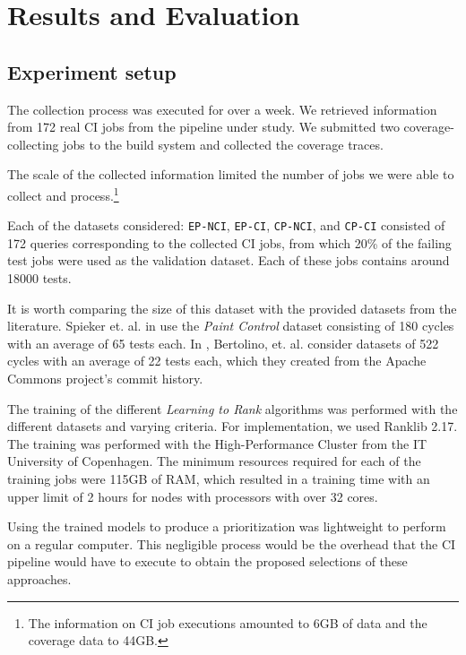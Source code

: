 \chapter{Results and Evaluation}\label{s:results}

\section{Experiment setup}\label{s:results-experimentsetup}

The collection process was executed for over a week. We retrieved information from
172 real CI jobs from the pipeline under study. We submitted two coverage-collecting jobs 
to the build system and collected the coverage traces.

The scale of the collected information limited the number of jobs we were able to
collect and process.\footnote{The information on CI job executions amounted to 6GB of data and 
the coverage data to 44GB. }

Each of the datasets considered: \texttt{EP-NCI}, \texttt{EP-CI}, \texttt{CP-NCI}, and \texttt{CP-CI} 
consisted of 172 queries corresponding to the collected CI jobs, from which 20\% 
of the failing test jobs were used as the validation dataset. Each of these jobs
contains around 18000 tests.

It is worth comparing the size of this dataset with the provided datasets from the literature.
Spieker et. al. in \cite{DBLP:journals/corr/abs-1811-04122} use the \emph{Paint Control} dataset consisting of 180 cycles
with an average of 65 tests each.  In \cite{Bertolino2020LearningtoRankVR}, Bertolino, et. al. consider datasets
of 522 cycles with an average of 22 tests each, which they created from the Apache Commons project's 
commit history.

The training of the different \emph{Learning to Rank} algorithms was performed with the
different datasets and varying criteria. For implementation, we used Ranklib 2.17. The training
was performed with the High-Performance Cluster from the IT University of Copenhagen. The minimum resources 
required for each of the training jobs were 115GB of RAM, which resulted in a training time with an upper limit of 2 hours
for nodes with processors with over 32 cores.

Using the trained models to produce a prioritization was lightweight to perform on
a regular computer. This negligible process would be the overhead that the CI pipeline would have to execute
to obtain the proposed selections of these approaches.

